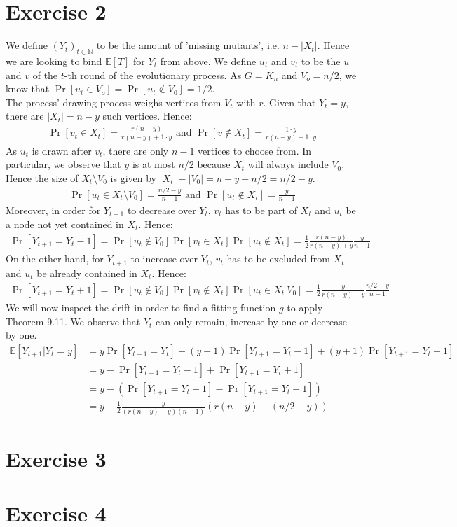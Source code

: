\documentclass[a4paper,german]{article}
\newcommand{\E}{\mathbb{E}}
\begin{document}
\section*{Exercise 2}
We define \((Y_t)_{t \in \mathbb{N}}\) to be the amount of 'missing mutants', i.e. \(n - |X_t|\). Hence we are looking to bind \(\E[T]\) for \(Y_t\) from above. We define \(u_t\) and \(v_t\) to be the \(u\) and \(v\) of the \(t\)-th round of the evolutionary process. As \(G = K_n\) and \(V_o = n/2\), we know that \(\Pr[u_t \in V_o] = \Pr[u_t \notin V_0] = 1/2\). \\
The process' drawing process weighs vertices from \(V_t\) with \(r\). Given that \(Y_t = y\), there are \( |X_t| = n - y\) such vertices. Hence:
\begin{align*}
\Pr[v_t \in X_t] = \frac{r(n-y)}{r(n-y) + 1 \cdot y} \text{ and } \Pr[v \notin X_t] = \frac{1 \cdot y}{r(n-y) + 1 \cdot y} 
\end{align*}
As \(u_t\) is drawn after \(v_t\), there are only \(n-1\) vertices to choose from. In particular, we observe that \(y\) is at most \(n/2\) because \(X_t\) will always include \(V_0\). Hence the size of \(X_t \setminus V_0\) is given by \(|X_t| - |V_0| = n - y - n/2 = n/2 - y\).
\begin{align*}
\Pr[u_t \in X_t \setminus V_0] = \frac{n/2 - y}{n-1} \text{ and } \Pr[u_t \notin X_t] = \frac{y}{n-1}
\end{align*}
Moreover, in order for \(Y_{t+1}\) to decrease over \(Y_t\), \(v_t\) has to be part of \(X_t\) and \(u_t\) be a node not yet contained in \(X_t\). Hence:
\begin{align*}
\Pr[Y_{t+1} = Y_t - 1] = \Pr[u_t \notin V_0] \Pr[v_t \in X_t] \Pr [u_t \notin X_t] = \frac{1}{2} \frac{r(n-y)}{r(n-y) + y} \frac{y}{n-1}
\end{align*}
On the other hand, for \(Y_{t+1}\) to increase over \(Y_t\),  \(v_t\) has to be excluded from \(X_t\) and \(u_t\) be already contained in \(X_t\). Hence:
\begin{align*}
\Pr[Y_{t+1} = Y_t + 1] = \Pr[u_t \notin V_0] \Pr[v_t \notin X_t] \Pr [u_t \in X_t \ V_0] = \frac{1}{2} \frac{y}{r(n-y) + y} \frac{n/2 - y}{n-1}
\end{align*}
We will now inspect the drift in order to find a fitting function \(g\) to apply Theorem 9.11. We observe that \(Y_t\) can only remain, increase by one or decrease by one.
\begin{align*}
\E[Y_{t+1} | Y_t = y] &= y \Pr[Y_{t+1} = Y_t] + (y-1)\Pr[Y_{t+1} = Y_t - 1] + (y+1)\Pr[Y_{t+1} = Y_t + 1] \\
&=y - \Pr[Y_{t+1} = Y_t - 1] + \Pr[Y_{t+1} = Y_t + 1] \\
&=y - (\Pr[Y_{t+1} = Y_t - 1] - \Pr[Y_{t+1} = Y_t + 1]) \\
&= y - \frac{1}{2}\frac{y}{(r(n-y) +y) (n-1)} (r(n-y) - (n/2 - y))
\end{align*}

\section*{Exercise 3}
\section*{Exercise 4}
\end{document}
